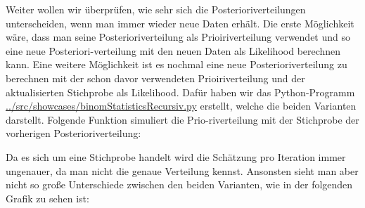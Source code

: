 \documentclass[a4paper,12pt]{article}
\begin{document}
Weiter wollen wir überprüfen, wie sehr sich die Posterioriverteilungen unterscheiden, wenn man immer wieder neue Daten erhält. Die erste Möglichkeit wäre, dass man seine Posterioriverteilung als Prioiriverteilung verwendet und so eine neue Posteriori-verteilung mit den neuen Daten als Likelihood berechnen kann. Eine weitere Möglichkeit ist es nochmal eine neue Posterioriverteilung zu berechnen mit der schon davor verwendeten Prioiriverteilung und der aktualisierten Stichprobe als Likelihood. Dafür haben wir das Python-Programm \url{../src/showcases/binomStatisticsRecursiv.py} erstellt, welche die beiden Varianten darstellt. Folgende Funktion simuliert die Prio-riverteilung mit der Stichprobe der vorherigen Posterioriverteilung:

\noindent Da es sich um eine Stichprobe handelt wird die Schätzung pro Iteration immer ungenauer, da man nicht die genaue Verteilung kennst. Ansonsten sieht man aber nicht so große Unterschiede zwischen den beiden Varianten, wie in der folgenden Grafik zu sehen ist:
\end{document}
